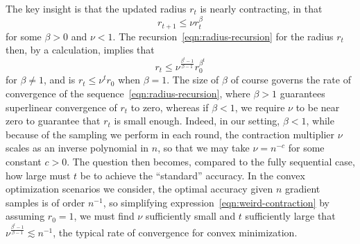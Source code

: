 The key insight is that the updated radius $r_t$ is nearly contracting, in
that
\begin{equation}
  \label{eqn:radius-recursion}
  r_{t + 1} \le \nu r_t^\beta
\end{equation}
for some $\beta > 0$ and $\nu < 1$. The
recursion~\eqref{eqn:radius-recursion} for the radius $r_t$ then, by a
calculation, implies that
\begin{equation}
  \label{eqn:weird-contraction}
  r_t \le \nu^\frac{\beta^t - 1}{\beta - 1} r_0^{\beta^t}
\end{equation}
for $\beta \neq 1$, and is $r_t \le \nu^t r_0$ when $\beta = 1$. The size
of $\beta$ of course governs the rate of convergence of the
sequence~\eqref{eqn:radius-recursion}, where $\beta > 1$ guarantees
superlinear convergence of $r_t$ to zero, whereas if $\beta < 1$, we require
$\nu$ to be near zero to guarantee that $r_t$ is small enough. Indeed, in
our setting, $\beta < 1$, while because of the sampling we perform in each
round, the contraction multiplier $\nu$ scales as an inverse polynomial
in $n$, so that we may take $\nu = n^{-c}$ for some constant $c > 0$.
The question then becomes, compared to the fully sequential case, how large
must $t$ be to achieve the ``standard'' accuracy.  In the convex
optimization scenarios we consider, the optimal accuracy given $n$ gradient
samples is of order $n^{-1}$, so simplifying
expression~\eqref{eqn:weird-contraction} by assuming $r_0 = 1$, we must find
$\nu$ sufficiently small and $t$ sufficiently large that
$\nu^{\frac{\beta^t - 1}{\beta - 1}} \lesssim n^{-1}$, the typical
rate of convergence for convex minimization.

